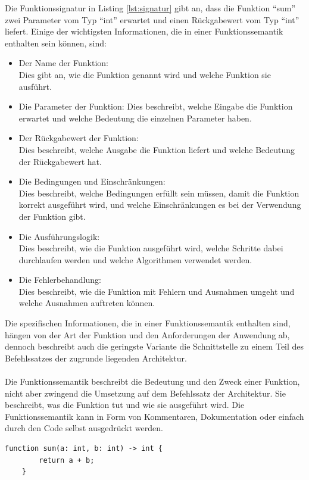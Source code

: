 Die Funktionssignatur in Listing \ref{lst:signatur} gibt an, dass die Funktion \enquote{sum} zwei Parameter vom Typ \enquote{int} erwartet und einen Rückgabewert vom Typ \enquote{int} liefert. Einige der wichtigsten Informationen, die in einer Funktionssemantik enthalten sein können, sind:
\begin{itemize} 
\item Der Name der Funktion:\\ Dies gibt an, wie die Funktion genannt wird und welche Funktion sie ausführt.
\item Die Parameter der Funktion: Dies beschreibt, welche Eingabe die Funktion erwartet und welche Bedeutung die einzelnen Parameter haben.
\item Der Rückgabewert der Funktion:\\ Dies beschreibt, welche Ausgabe die Funktion liefert und welche Bedeutung der Rückgabewert hat.
\item Die Bedingungen und Einschränkungen:\\ Dies beschreibt, welche Bedingungen erfüllt sein müssen, damit die Funktion korrekt ausgeführt wird, und welche Einschränkungen es bei der Verwendung der Funktion gibt.
\item Die Ausführungslogik:\\ Dies beschreibt, wie die Funktion ausgeführt wird, welche Schritte dabei durchlaufen werden und welche Algorithmen verwendet werden.
\item Die Fehlerbehandlung:\\ Dies beschreibt, wie die Funktion mit Fehlern und Ausnahmen umgeht und welche Ausnahmen auftreten können.
\end{itemize} 
Die spezifischen Informationen, die in einer Funktionssemantik enthalten sind, hängen von der Art der Funktion und den Anforderungen der Anwendung ab, dennoch beschreibt auch die geringste Variante die Schnittstelle zu einem Teil des Befehlssatzes der zugrunde liegenden Architektur. 
\\\\
Die Funktionssemantik beschreibt die Bedeutung und den Zweck einer Funktion, nicht aber zwingend die Umsetzung auf dem Befehlssatz der Architektur. Sie beschreibt, was die Funktion tut und wie sie ausgeführt wird. Die Funktionssemantik kann in Form von Kommentaren, Dokumentation oder einfach durch den Code selbst ausgedrückt werden.
\begin{lstlisting}[caption={Funktionssemantik},captionpos=b,label={lst:semantik}]
    function sum(a: int, b: int) -> int {
        return a + b;
    }
\end{lstlisting}

